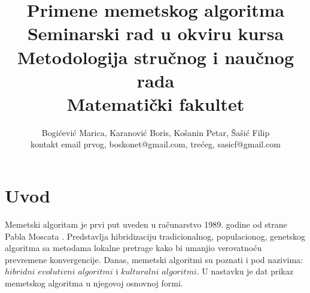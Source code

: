\documentclass[a4paper]{article}
\begin{document}
\title{Primene memetskog algoritma\\ \small{Seminarski rad u okviru kursa\\Metodologija stručnog i naučnog rada\\ Matematički fakultet}}

\author{Bogićević Marica, Karanović Boris, Košanin Petar, Šašić Filip\\ kontakt email prvog, boskonet@gmail.com, trećeg, sasicf@gmail.com}


\maketitle


\tableofcontents

\newpage

\section{Uvod}
\label{sec:uvod}

Memetski algoritam je prvi put uveden u računarstvo 1989. godine od strane Pabla Moscata \cite{towardsmemetic}. Predstavlja hibridizaciju tradicionalnog, populacionog, genetskog algoritma sa metodama lokalne pretrage kako bi umanjio verovatnoću prevremene konvergencije. Danas, memetski algoritmi su poznati i pod nazivima: $hibridni$ $evolutivni$ $algoritmi$ i $kulturalni$ $algoritmi$. U nastavku je dat prikaz memetskog algoritma u njegovoj osnovnoj formi.
\end{document}

